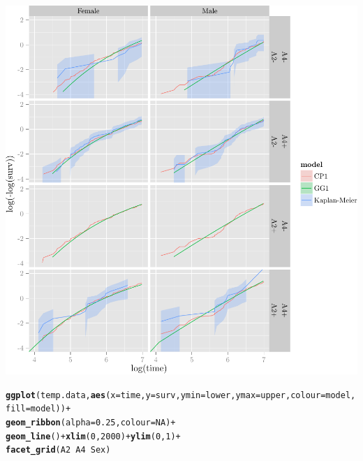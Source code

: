 \documentclass{article}\usepackage[]{graphicx}\usepackage[]{color}
\makeatletter
\def\maxwidth{ %
  \ifdim\Gin@nat@width>\linewidth
    \linewidth
  \else
    \Gin@nat@width
  \fi
}
\newcommand{\hlnum}[1]{\textcolor[rgb]{0.686,0.059,0.569}{#1}}%
\newcommand{\hlopt}[1]{\textcolor[rgb]{0,0,0}{#1}}%
\newcommand{\hlstd}[1]{\textcolor[rgb]{0.345,0.345,0.345}{#1}}%
\newcommand{\hlkwc}[1]{\textcolor[rgb]{0.333,0.667,0.333}{#1}}%
\newcommand{\hlkwd}[1]{\textcolor[rgb]{0.737,0.353,0.396}{\textbf{#1}}}%
\newenvironment{kframe}{%
 \def\at@end@of@kframe{}%
 \ifinner\ifhmode%
  \def\at@end@of@kframe{\end{minipage}}%
  \begin{minipage}{\columnwidth}%
 \fi\fi%
 \def\FrameCommand##1{\hskip\@totalleftmargin \hskip-\fboxsep
 \colorbox{shadecolor}{##1}\hskip-\fboxsep
     \hskip-\linewidth \hskip-\@totalleftmargin \hskip\columnwidth}%
 \MakeFramed {\advance\hsize-\width
   \@totalleftmargin\z@ \linewidth\hsize
   \@setminipage}}%
 {\par\unskip\endMakeFramed%
 \at@end@of@kframe}
\newenvironment{knitrout}{}{} %
\makeatother
\begin{document}
\begin{knitrout}
\begin{kframe}
{\ttfamily\noindent\color{warningcolor}{\#\# Warning: Removed 40 rows containing missing values (geom\_path).}}

{\ttfamily\noindent\color{warningcolor}{\#\# Warning: Removed 37 rows containing missing values (geom\_path).}}\end{kframe}

{\centering \includegraphics[width=\maxwidth]{figure/05-final-fit-assessment-4-1} 

}


\begin{kframe}\begin{alltt}
\hlkwd{ggplot}\hlstd{(temp.data,} \hlkwd{aes}\hlstd{(}\hlkwc{x} \hlstd{= time,} \hlkwc{y} \hlstd{= surv,} \hlkwc{ymin} \hlstd{= lower,} \hlkwc{ymax} \hlstd{= upper,} \hlkwc{colour} \hlstd{= model,} \hlkwc{fill} \hlstd{= model))} \hlopt{+}
        \hlkwd{geom_ribbon}\hlstd{(}\hlkwc{alpha} \hlstd{=} \hlnum{0.25}\hlstd{,} \hlkwc{colour} \hlstd{=} \hlnum{NA}\hlstd{)} \hlopt{+}
        \hlkwd{geom_line}\hlstd{()} \hlopt{+} \hlkwd{xlim}\hlstd{(}\hlnum{0}\hlstd{,} \hlnum{2000}\hlstd{)} \hlopt{+} \hlkwd{ylim}\hlstd{(}\hlnum{0}\hlstd{,} \hlnum{1}\hlstd{)} \hlopt{+}
        \hlkwd{facet_grid}\hlstd{(A2} \hlopt{~} \hlstd{A4} \hlopt{~} \hlstd{Sex)}
\end{alltt}



\end{kframe}
\end{knitrout}
\end{document}
